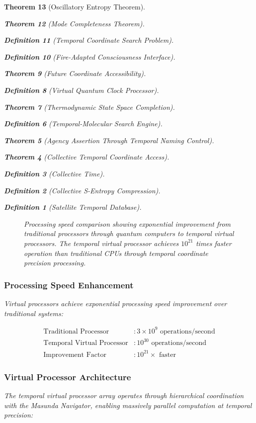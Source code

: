 \documentclass[12pt,a4paper]{article}
\newtheorem{theorem}{Theorem}[section]
\newtheorem{definition}[theorem]{Definition}
\begin{document}
\begin{theorem}[Oscillatory Entropy Theorem]
\begin{theorem}[Mode Completeness Theorem]
\begin{enumerate}
\begin{definition}[Temporal Coordinate Search Problem]
\begin{algorithm}
\begin{definition}[Fire-Adapted Consciousness Interface]
\begin{theorem}[Future Coordinate Accessibility]
\begin{definition}[Virtual Quantum Clock Processor]
\begin{itemize}
\begin{itemize}
\begin{theorem}[Thermodynamic State Space Completion]
\begin{definition}[Temporal-Molecular Search Engine]
\begin{theorem}[Agency Assertion Through Temporal Naming Control]
\begin{remark}
\begin{theorem}[Collective Temporal Coordinate Access]
\begin{definition}[Collective Time]
\begin{definition}[Collective S-Entropy Compression]
\begin{definition}[Satellite Temporal Database]
\begin{algorithm}
\begin{table}[h]
{\begin{figure}[h]
\begin{tikzpicture}[
    node distance=2cm,
    proc/.style={rectangle, draw, text width=2.5cm, text centered, minimum height=1.5cm},
    arrow/.style={thick,->,>=stealth}
]
\end{tikzpicture}
\caption{Processing speed comparison showing exponential improvement from traditional processors through quantum computers to temporal virtual processors. The temporal virtual processor achieves $10^{21}$ times faster operation than traditional CPUs through temporal coordinate precision processing.}
\label{fig:processing_speed_comparison}
\end{figure}

\subsubsection{Processing Speed Enhancement}

Virtual processors achieve exponential processing speed improvement over traditional systems:

\begin{align}
\text{Traditional Processor} &: 3 \times 10^9 \text{ operations/second} \\
\text{Temporal Virtual Processor} &: 10^{30} \text{ operations/second} \\
\text{Improvement Factor} &: 10^{21}\times \text{ faster}
\end{align}

\subsubsection{Virtual Processor Architecture}

The temporal virtual processor array operates through hierarchical coordination with the Masunda Navigator, enabling massively parallel computation at temporal precision:

}
\end{table}
\end{algorithm}
\end{definition}
\end{definition}
\end{definition}
\end{theorem}
\end{remark}
\end{theorem}
\end{definition}
\end{theorem}
\end{itemize}
\end{itemize}
\end{definition}
\end{theorem}
\end{definition}
\end{algorithm}
\end{definition}
\end{enumerate}
\end{theorem}
\end{theorem}
\end{document}

